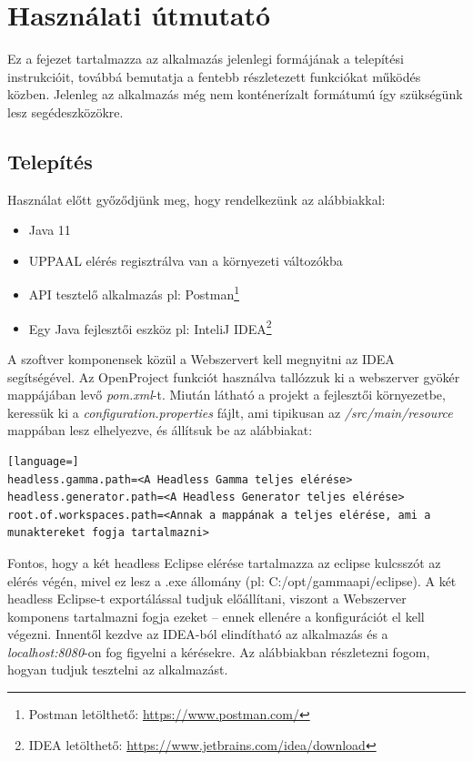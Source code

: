 
\chapter{Használati útmutató}

Ez a fejezet tartalmazza az alkalmazás jelenlegi formájának a telepítési instrukcióit, továbbá bemutatja a fentebb részletezett funkciókat működés közben. Jelenleg az alkalmazás még nem konténerízalt formátumú így szükségünk lesz segédeszközökre. 
\section{Telepítés}

Használat előtt győződjünk meg, hogy rendelkezünk az alábbiakkal:
\begin{itemize}
	\item Java 11
	\item UPPAAL elérés regisztrálva van a környezeti változókba
	\item API tesztelő alkalmazás pl: Postman\footnote{Postman letölthető: \url{https://www.postman.com/}}
	\item Egy Java fejlesztői eszköz pl: InteliJ IDEA\footnote{IDEA letölthető: \url{https://www.jetbrains.com/idea/download}}
\end{itemize}

A szoftver komponensek közül a Webszervert kell megnyitni az IDEA segítségével. Az OpenProject funkciót használva tallózzuk ki a webszerver gyökér mappájában levő \textit{pom.xml}-t.  Miután látható a projekt a fejlesztői környezetbe, keressük ki a \textit{configuration.properties} fájlt, ami tipikusan az \textit{/src/main/resource} mappában lesz elhelyezve, és állítsuk be az alábbiakat:

\begin{lstlisting}[language=]
headless.gamma.path=<A Headless Gamma teljes elérése>
headless.generator.path=<A Headless Generator teljes elérése>
root.of.workspaces.path=<Annak a mappának a teljes elérése, ami a munaktereket fogja tartalmazni>
\end{lstlisting}

Fontos, hogy a két headless Eclipse elérése tartalmazza az eclipse kulcsszót az elérés végén, mivel ez lesz a .exe állomány (pl: C:/opt/gammaapi/eclipse). A két headless Eclipse-t exportálással tudjuk előállítani, viszont a Webszerver komponens tartalmazni fogja ezeket -- ennek ellenére a konfigurációt el kell végezni.
Innentől kezdve az IDEA-ból elindítható az alkalmazás és a \textit{localhost:8080}-on fog figyelni a kérésekre. Az alábbiakban részletezni fogom, hogyan tudjuk tesztelni az alkalmazást.
